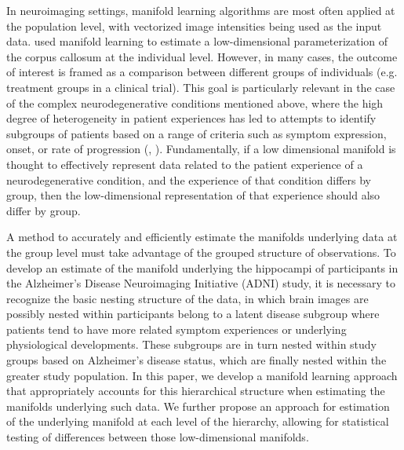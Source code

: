 \documentclass[11pt,reqno]{article}
\theoremstyle{definition}
\begin{document}
In neuroimaging settings, manifold learning algorithms are most often applied at the population level, with vectorized image intensities being used as the input data. \cite{yueParameterizationWhiteMatter2016} used manifold learning to estimate a low-dimensional parameterization of the corpus callosum at the individual level. However, in many cases, the outcome of interest is framed as a comparison between different groups of individuals (e.g. treatment groups in a clinical trial). This goal is particularly relevant in the case of the complex neurodegenerative conditions mentioned above, where the high degree of heterogeneity in patient experiences has led to attempts to identify subgroups of patients based on a range of criteria such as symptom expression, onset, or rate of progression (\cite{ferreiraBiologicalSubtypesAlzheimer2020}, \cite{venutoPredictingAmbulatoryCapacity}). Fundamentally, if a low dimensional manifold is thought to effectively represent data related to the patient experience of a neurodegenerative condition, and the experience of that condition differs by group, then the low-dimensional representation of that experience should also differ by group.

A method to accurately and efficiently estimate the manifolds underlying data at the group level must take advantage of the grouped structure of observations. To develop an estimate of the manifold underlying the hippocampi of participants in the Alzheimer's Disease Neuroimaging Initiative (ADNI) study, it is necessary to recognize the basic nesting structure of the data, in which brain images are possibly nested within participants belong to a latent disease subgroup where patients tend to have more related symptom experiences or underlying physiological developments. These subgroups are in turn nested within study groups based on Alzheimer's disease status, which are finally nested within the greater study population. In this paper, we develop a manifold learning approach that appropriately accounts for this hierarchical structure when estimating the manifolds underlying such data. We further propose an approach for estimation of the underlying manifold at each level of the hierarchy, allowing for statistical testing of differences between those low-dimensional manifolds.
\end{document}
